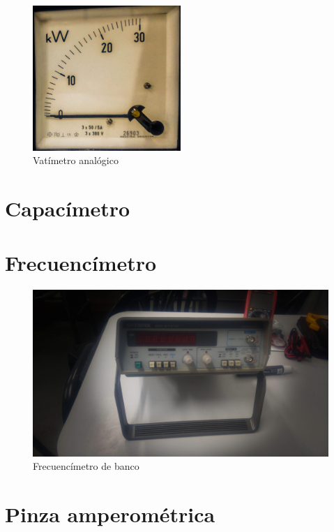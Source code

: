 \begin{figure}[htbp]
  \centering
  \includegraphics[width=0.5\textwidth,height=\textheight,keepaspectratio]{images/fotos/vatimetro.jpg}
  \caption{Vatímetro analógico}
  \label{fig:vatimetro}
\end{figure}

\section{Capacímetro}
\section{Frecuencímetro}

\begin{figure}[htbp]
  \centering
  \includegraphics[width=\textwidth,height=\textheight,keepaspectratio]{images/fotos/frecuencimetro.jpg}
  \caption{Frecuencímetro de banco}
  \label{fig:frecuencimetro}
\end{figure}

\section{Pinza amperométrica}

